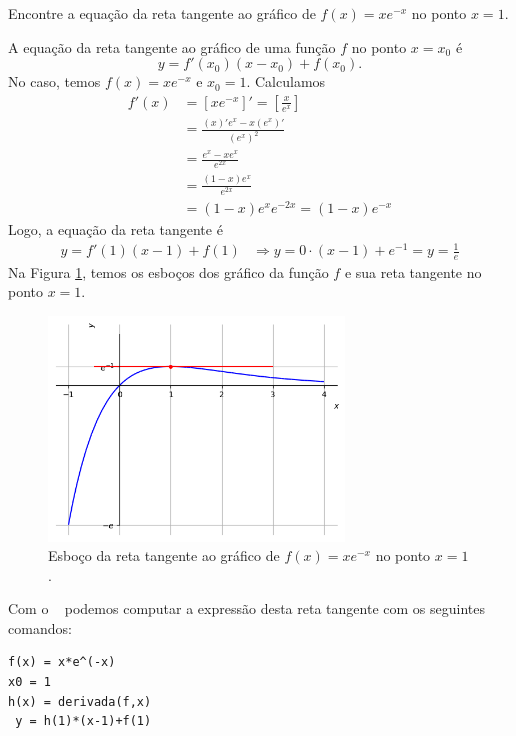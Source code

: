 \cleardoublepage\documentclass[../main.tex]{subfiles}
\begin{document}
\begin{exeresol}
  Encontre a equação da reta tangente ao gráfico de $f(x) = xe^{-x}$ no ponto $x=1$.
\end{exeresol}
\begin{resol}
  A equação da reta tangente ao gráfico de uma função $f$ no ponto $x=x_0$ é
  \begin{equation*}
    y = f'(x_0)(x-x_0)+f(x_0).
  \end{equation*}
  No caso, temos $f(x)=xe^{-x}$ e $x_0=1$. Calculamos
  \begin{align*}
    f'(x) &= [xe^{-x}]' = \left[\frac{x}{e^x}\right] \\
          &= \frac{(x)'e^x-x(e^x)'}{(e^x)^2} \\
          &= \frac{e^x-xe^x}{e^{2x}} \\
          &= \frac{(1-x)e^x}{e^{2x}} \\
          &= (1-x)e^xe^{-2x} = (1-x)e^{-x}
  \end{align*}
  Logo, a equação da reta tangente é
  \begin{align*}
    y = f'(1)(x-1)+f(1) &\Rightarrow y = 0\cdot (x-1) + e^{-1}= y = \frac{1}{e}
  \end{align*}
  Na Figura \ref{fig:deriv_exeresol_rt_xe-x}, temos os esboços dos gráfico da função $f$ e sua reta tangente no ponto $x=1$.

  \begin{figure}[!htb]
    \centering
    \includegraphics[width=0.7\textwidth]{fig_deriv/fig_deriv_exeresol_rt_xe-x}
    \caption{Esboço da reta tangente ao gráfico de $f(x)=xe^{-x}$ no ponto $x=1$.}
    \label{fig:deriv_exeresol_rt_xe-x}
  \end{figure}

  
  Com o \geogebra~ podemos computar a expressão desta reta tangente com os seguintes comandos:
\begin{verbatim}
f(x) = x*e^(-x)
x0 = 1
h(x) = derivada(f,x)
 y = h(1)*(x-1)+f(1)
\end{verbatim}
\vspace{-0.5cm}
\end{resol}
\end{document}
